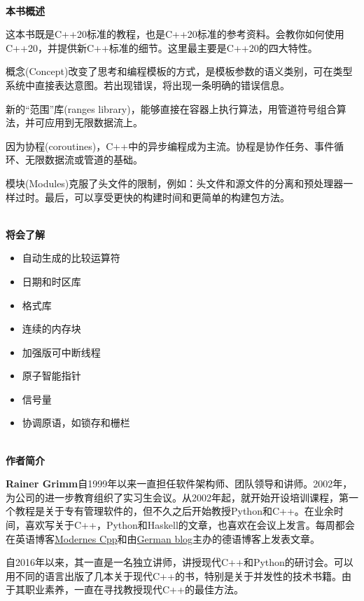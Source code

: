 \documentclass[11pt,a4paper,UTF8]{book}
\begin{document}
\begin{sloppypar}
  \hspace*{\fill} \\ %
  \noindent\textbf{本书概述}
  
  这本书既是C++20标准的教程，也是C++20标准的参考资料。会教你如何使用C++20，并提供新C++标准的细节。这里最主要是C++20的四大特性。

  概念(Concept)改变了思考和编程模板的方式，是模板参数的语义类别，可在类型系统中直接表达意图。若出现错误，将出现一条明确的错误信息。

  新的“范围”库(ranges library)，能够直接在容器上执行算法，用管道符号组合算法，并可应用到无限数据流上。

  因为协程(coroutines)，C++中的异步编程成为主流。协程是协作任务、事件循环、无限数据流或管道的基础。

  模块(Modules)克服了头文件的限制，例如：头文件和源文件的分离和预处理器一样过时。最后，可以享受更快的构建时间和更简单的构建包方法。

  \hspace*{\fill} \\ %
  \noindent\textbf{将会了解}
  \begin{itemize}
    \item 自动生成的比较运算符
    \item 日期和时区库
    \item 格式库
    \item 连续的内存块
    \item 加强版可中断线程
    \item 原子智能指针
    \item 信号量
    \item 协调原语，如锁存和栅栏
  \end{itemize}
  
  \hspace*{\fill} \\ %
  \noindent\textbf{作者简介}
  
  \textbf{Rainer Grimm}自1999年以来一直担任软件架构师、团队领导和讲师。2002年，为公司的进一步教育组织了实习生会议。从2002年起，就开始开设培训课程，第一个教程是关于专有管理软件的，但不久之后开始教授Python和C++。在业余时间，喜欢写关于C++，Python和Haskell的文章，也喜欢在会议上发言。每周都会在英语博客\href{https://www.modernescpp.com/}{Modernes Cpp}和由\href{https://www.grimm-jaud.de/index.php/blog}{German blog}主办的德语博客上发表文章。
  
  自2016年以来，其一直是一名独立讲师，讲授现代C++和Python的研讨会。可以用不同的语言出版了几本关于现代C++的书，特别是关于并发性的技术书籍。由于其职业素养，一直在寻找教授现代C++的最佳方法。
  

\end{sloppypar}
\end{document}
